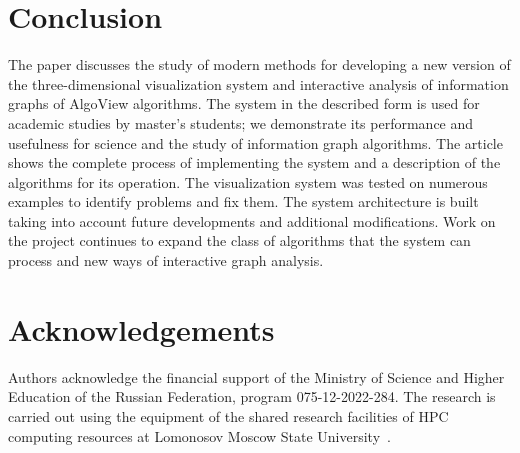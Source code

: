 \section{Conclusion}

The paper discusses the study of modern methods for developing a new version of the three-dimensional visualization system and interactive analysis of information graphs of AlgoView algorithms. The system in the described form is used for academic studies by master's students; we demonstrate its performance and usefulness for science and the study of information graph algorithms. The article shows the complete process of implementing the system and a description of the algorithms for its operation. The visualization system was tested on numerous examples to identify problems and fix them. The system architecture is built taking into account future developments and additional modifications. Work on the project continues to expand the class of algorithms that the system can process and new ways of interactive graph analysis.

\section*{Acknowledgements}

Authors acknowledge the financial support of the Ministry of Science and Higher Education of the Russian Federation, program 075-12-2022-284. The research is carried out using the equipment of the shared research facilities of HPC computing resources at Lomonosov Moscow State University~\cite{vvv_lom2}.
